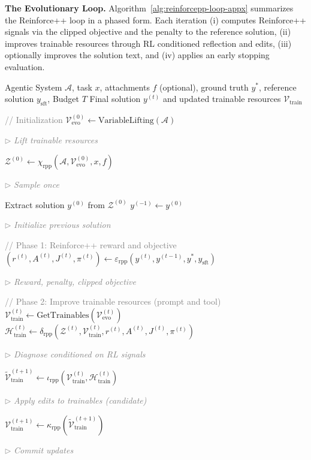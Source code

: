 \textbf{The Evolutionary Loop.}
Algorithm~\ref{alg:reinforcepp-loop-appx} summarizes the Reinforce++ loop in a phased form. Each iteration (i) computes Reinforce++ signals via the clipped objective and the penalty to the reference solution, (ii) improves trainable resources through RL conditioned reflection and edits, (iii) optionally improves the solution text, and (iv) applies an early stopping evaluation.

\begin{algorithm}[t]
  \caption{Reinforce++ Optimization Loop}
  \label{alg:reinforcepp-loop-appx}
  \newcommand{\algcommentrpp}[1]{\hfill\parbox[t]{0.48\linewidth}{\raggedleft\footnotesize\textcolor{gray}{$\rhd$ \textit{#1}}}}
  \begin{algorithmic}[1]
  \renewcommand{\algorithmicrequire}{\textbf{Input:}}
  \renewcommand{\algorithmicensure}{\textbf{Output:}}
  \REQUIRE Agentic System $\mathcal{A}$, task $x$, attachments $f$ (optional), ground truth $y^{*}$, reference solution $y_{\mathrm{sft}}$, Budget $T$
  \ENSURE Final solution $y^{(t)}$ and updated trainable resources $\mathcal{V}_{\text{train}}$

  \STATE \textcolor{gray}{// Initialization}
  \STATE $\mathcal{V}_{\text{evo}}^{(0)} \leftarrow \text{VariableLifting}(\mathcal{A})$ \algcommentrpp{Lift trainable resources}
  \STATE $\mathcal{Z}^{(0)} \leftarrow \chi_{\mathrm{rpp}}(\mathcal{A}, \mathcal{V}_{\text{evo}}^{(0)}, x, f)$ \algcommentrpp{Sample once}
  \STATE Extract solution $y^{(0)}$ from $\mathcal{Z}^{(0)}$
  \STATE $y^{(-1)} \leftarrow y^{(0)}$ \algcommentrpp{Initialize previous solution}
  
      \STATE \textcolor{gray}{// Phase 1: Reinforce++ reward and objective}
      \STATE $(r^{(t)}, A^{(t)}, J^{(t)}, \pi^{(t)}) \leftarrow \varepsilon_{\mathrm{rpp}}(y^{(t)}, y^{(t-1)}, y^{*}, y_{\mathrm{sft}})$ \algcommentrpp{Reward, penalty, clipped objective}

      \vspace{0.1em}
      \STATE \textcolor{gray}{// Phase 2: Improve trainable resources (prompt and tool)}
      \STATE $\mathcal{V}_{\text{train}}^{(t)} \leftarrow \text{GetTrainables}(\mathcal{V}_{\text{evo}}^{(t)})$
      \STATE $\mathcal{H}_{\text{train}}^{(t)} \leftarrow \delta_{\mathrm{rpp}}(\mathcal{Z}^{(t)}, \mathcal{V}_{\text{train}}^{(t)}, r^{(t)}, A^{(t)}, J^{(t)}, \pi^{(t)})$ \algcommentrpp{Diagnose conditioned on RL signals}
      \STATE $\widetilde{\mathcal{V}}_{\text{train}}^{(t+1)} \leftarrow \iota_{\mathrm{rpp}}(\mathcal{V}_{\text{train}}^{(t)}, \mathcal{H}_{\text{train}}^{(t)})$ \algcommentrpp{Apply edits to trainables (candidate)}
      \STATE $\mathcal{V}_{\text{train}}^{(t+1)} \leftarrow \kappa_{\mathrm{rpp}}(\widetilde{\mathcal{V}}_{\text{train}}^{(t+1)})$ \algcommentrpp{Commit updates}


\end{algorithmic}
\end{algorithm}
